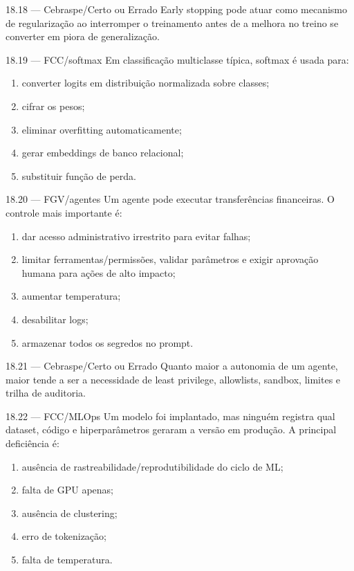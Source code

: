 \begin{questao}{ 18.18 — Cebraspe/Certo ou Errado}
Early stopping pode atuar como mecanismo de regularização ao interromper o treinamento antes de a melhora no treino se converter em piora de generalização.
\end{questao}

\begin{questao}{ 18.19 — FCC/softmax}
Em classificação multiclasse típica, softmax é usada para:
\begin{enumerate}[label=\Alph*)]
\item converter logits em distribuição normalizada sobre classes;
\item cifrar os pesos;
\item eliminar overfitting automaticamente;
\item gerar embeddings de banco relacional;
\item substituir função de perda.
\end{enumerate}
\end{questao}

\begin{questao}{ 18.20 — FGV/agentes}
Um agente pode executar transferências financeiras. O controle mais importante é:
\begin{enumerate}[label=\Alph*)]
\item dar acesso administrativo irrestrito para evitar falhas;
\item limitar ferramentas/permissões, validar parâmetros e exigir aprovação humana para ações de alto impacto;
\item aumentar temperatura;
\item desabilitar logs;
\item armazenar todos os segredos no prompt.
\end{enumerate}
\end{questao}

\begin{questao}{ 18.21 — Cebraspe/Certo ou Errado}
Quanto maior a autonomia de um agente, maior tende a ser a necessidade de least privilege, allowlists, sandbox, limites e trilha de auditoria.
\end{questao}

\begin{questao}{ 18.22 — FCC/MLOps}
Um modelo foi implantado, mas ninguém registra qual dataset, código e hiperparâmetros geraram a versão em produção. A principal deficiência é:
\begin{enumerate}[label=\Alph*)]
\item ausência de rastreabilidade/reprodutibilidade do ciclo de ML;
\item falta de GPU apenas;
\item ausência de clustering;
\item erro de tokenização;
\item falta de temperatura.
\end{enumerate}
\end{questao}


